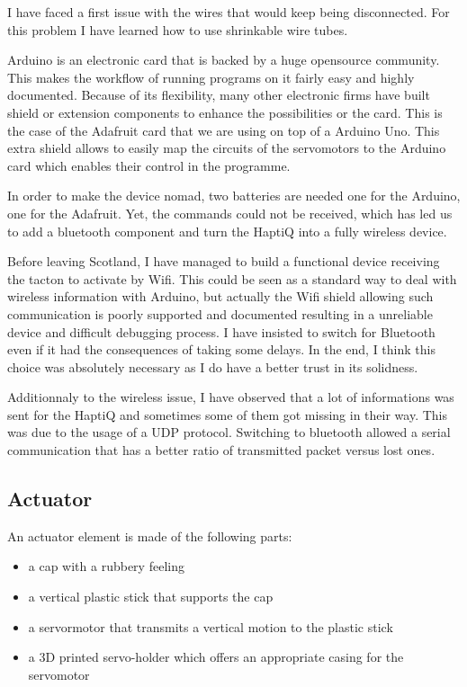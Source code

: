I have faced a first issue with the wires that would keep being disconnected. For this problem I have learned how to use shrinkable wire tubes.

Arduino is an electronic card that is backed by a huge opensource
community. This makes the workflow of running programs on it fairly easy
and highly documented. Because of its flexibility, many other electronic
firms have built shield or extension components to enhance the
possibilities or the card. This is the case of the Adafruit card that we
are using on top of a Arduino Uno. This extra shield allows to easily
map the circuits of the servomotors to the Arduino card which enables
their control in the programme.

In order to make the device nomad, two batteries are needed one for the
Arduino, one for the Adafruit. Yet, the commands could not be received,
which has led us to add a bluetooth component and turn the HaptiQ into a
fully wireless device.

Before leaving Scotland, I have managed to build a functional device receiving the tacton to activate by Wifi. This could be seen as a standard way to deal with wireless information with Arduino, but actually the Wifi shield allowing such communication is poorly supported and documented resulting in a unreliable device and difficult debugging process. I have insisted to switch for Bluetooth even if it had the consequences of taking some delays. In the end, I think this choice was absolutely necessary as I do have a better trust in its solidness.

Additionnaly to the wireless issue, I have observed that a lot of informations was sent for the HaptiQ and sometimes some of them got missing in their way. This was due to the usage of a UDP protocol. Switching to bluetooth allowed a serial communication that has a better ratio of transmitted packet versus lost ones. 

\subsection{Actuator}

An actuator element is made of the following parts:

\begin{itemize}
\item
  a cap with a rubbery feeling
\item
  a vertical plastic stick that supports the cap
\item
  a servormotor that transmits a vertical motion to the plastic stick
\item
  a 3D printed servo-holder which offers an appropriate casing for the
  servomotor
\end{itemize}

